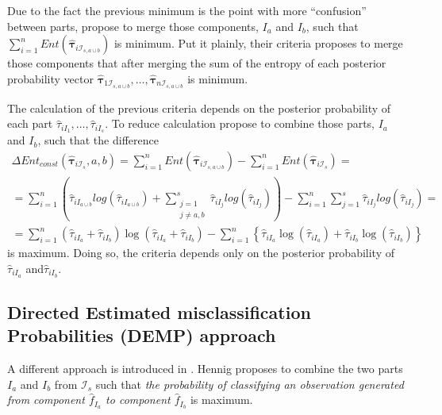 \documentclass[10pt, a4paper]{article}
\newcommand{\m}[1]{\boldsymbol{#1}}
\begin{document}
Due to the fact the previous minimum is the point with more ``confusion'' between parts, \cite{baudry2010combining} propose to merge those components, $I_a$ and $I_b$, such that $\sum_{i=1}^n Ent( \hat{\m \tau}_{i \mathcal{I}_{s, a \cup b}} )$ is minimum. Put it plainly, their criteria proposes to merge those components that after merging the sum of the entropy of each posterior probability vector $\hat{\m \tau}_{1 \mathcal{I}_{s, a \cup b}}, \dots, \hat{\m \tau}_{n \mathcal{I}_{s, a \cup b}}$ is minimum.

The calculation of the previous criteria depends on the posterior probability of each part $\hat{\tau}_{iI_1}, \dots,\hat{\tau}_{iI_s}$. To reduce calculation \cite{baudry2010combining} propose to combine those parts, $I_a$ and $I_b$, such that the difference 
\begin{multline*}
\Delta Ent_{const}(\hat{\m \tau}_{i \mathcal{I}_s}, a, b) = \sum_{i=1}^n Ent( \hat{\m \tau}_{i \mathcal{I}_{s, a \cup b}}) - \sum_{i=1}^n Ent( \hat{\m \tau}_{i \mathcal{I}_s}) =  \\ = \sum_{i=1}^n  \left( \hat{\tau}_{i I_{a\cup b}}  log(\hat{\tau}_{i I_{a\cup b}} ) +  \sum_{\substack{j=1 \\
                                                            j \neq a, b}}^s \hat{\tau}_{i I_j}  log(\hat{\tau}_{i I_j} ) \right)  - \sum_{i=1}^n \sum_{j=1}^s \hat{\tau}_{i I_j}  log(\hat{\tau}_{i I_j} ) = \\  =   \sum_{i=1}^n  (\hat{\tau}_{iI_a}+\hat{\tau}_{iI_b}) \log(\hat{\tau}_{iI_a} + \hat{\tau}_{iI_b}) - \sum_{i=1}^n \left\{ \hat{\tau}_{iI_a} \log(\hat{\tau}_{iI_a}) + \hat{\tau}_{iI_b} \log(\hat{\tau}_{iI_b})\right\}
\end{multline*}
is maximum. Doing so, the criteria depends only on the posterior probability of $\hat{\tau}_{iI_a}$ and$ \hat{\tau}_{iI_b}$.


\subsection*{Directed Estimated misclassification Probabilities (DEMP) approach}

A different approach is introduced in \cite{hennig2010methods}. Hennig proposes to combine the two parts $I_a$ and $I_b$ from $ \mathcal{I}_s$ such that \emph{the probability of classifying an observation generated from component $\hat{f}_{I_a}$ to component $\hat{f}_{I_b}$} is maximum. 
\end{document}

